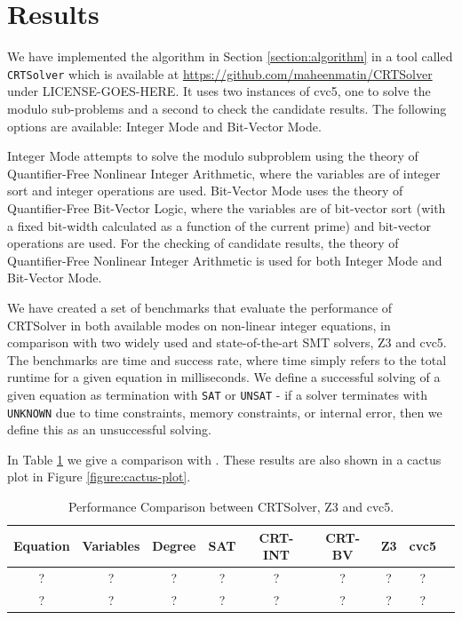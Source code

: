 \section{Results}
\label{section:results}

We have implemented the algorithm in Section \ref{section:algorithm}
in a tool called \texttt{CRTSolver} which is available at
\url{https://github.com/maheenmatin/CRTSolver} under LICENSE-GOES-HERE.
%
It uses two instances of cvc5, one to solve the modulo sub-problems
and a second to check the candidate results.  The following options
are available: Integer Mode and Bit-Vector Mode. 

Integer Mode attempts to
solve the modulo subproblem using the theory of Quantifier-Free Nonlinear
Integer Arithmetic, where the variables are of integer sort and integer
operations are used. 
Bit-Vector Mode uses the theory of Quantifier-Free
Bit-Vector Logic, where the variables are of bit-vector sort (with a fixed
bit-width calculated as a function of the current prime) and bit-vector
operations are used.
For the checking of candidate results, the theory of Quantifier-Free
Nonlinear Integer Arithmetic is used for both Integer Mode and Bit-Vector
Mode.

We have created a set of benchmarks that evaluate the performance of CRTSolver 
in both available modes on non-linear integer equations, in comparison with two
widely used and state-of-the-art SMT solvers, Z3 and cvc5.
The benchmarks are time and success rate, where time simply refers to the total runtime
for a given equation in milliseconds. We define a successful solving of a given
equation as termination with \texttt{SAT} or \texttt{UNSAT} - if a solver terminates
with \texttt{UNKNOWN} due to time constraints, memory constraints, or internal error,
then we define this as an unsuccessful solving.


In Table \ref{table:results} we give a comparison with .
These results are also shown in a cactus plot in Figure \ref{figure:cactus-plot}.


\begin{table}
  \caption{Performance Comparison between CRTSolver, Z3 and cvc5.}
  \label{table:results}
  \begin{tabular}{ccccccccc}
    \toprule
    Equation & Variables & Degree & SAT & CRT-INT & CRT-BV & Z3 & cvc5 \\
    \midrule
    ? & ? & ? & ? & ? & ? & ? & ? \\
    ? & ? & ? & ? & ? & ? & ? & ? \\
  \bottomrule
\end{tabular}
\end{table}

